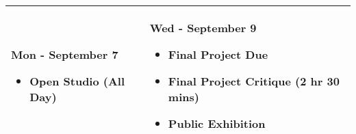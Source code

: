 \documentclass[10pt,letter,english]{article}
\begin{document}
\begin{longtable}[]{@{}ll@{}}
      \toprule
      \endhead
      \begin{minipage}[t]{0.47\columnwidth}\raggedright
            \textbf{{Mon - September 7}}

            \begin{itemize}
                  \item
                        Open Studio (All Day)
            \end{itemize}\strut
      \end{minipage} & \begin{minipage}[t]{0.47\columnwidth}\raggedright
            \textbf{{Wed - September 9}}

            \begin{itemize}
                  \item
                        \textbf{Final Project Due}
                  \item
                        Final Project Critique (2 hr 30 mins)
                  \item
                        Public Exhibition
            \end{itemize}\strut
      \end{minipage}\tabularnewline
      \bottomrule
\end{longtable}
\end{document}
